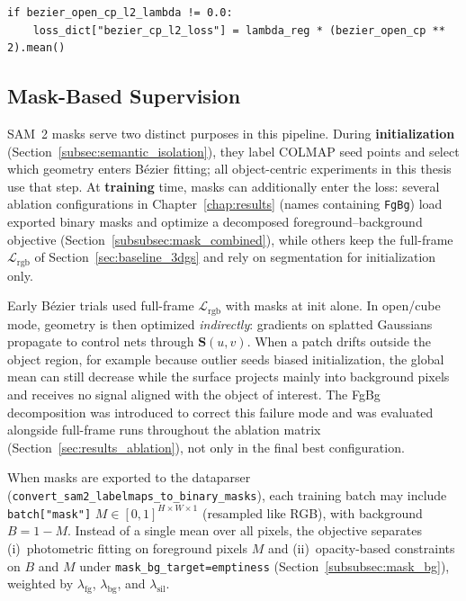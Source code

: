 \documentclass{report}
\newcommand{\filepath}[1]{\nolinkurl{#1}}
\newcommand{\code}[1]{\nolinkurl{#1}}
\begin{document}
\begin{lstlisting}[caption={Optional CP $L_2$ term (\filepath{splatfacto.py}).},label={lst:cp_l2}]
if bezier_open_cp_l2_lambda != 0.0:
    loss_dict["bezier_cp_l2_loss"] = lambda_reg * (bezier_open_cp ** 2).mean()
\end{lstlisting}

\subsection{Mask-Based Supervision}
\label{subsec:mask_losses}

SAM~2 masks serve two distinct purposes in this pipeline. During \textbf{initialization} (Section~\ref{subsec:semantic_isolation}), they label COLMAP seed points and select which geometry enters B\'ezier fitting; all object-centric experiments in this thesis use that step. At \textbf{training} time, masks can additionally enter the loss: several ablation configurations in Chapter~\ref{chap:results} (names containing \texttt{FgBg}) load exported binary masks and optimize a decomposed foreground--background objective (Section~\ref{subsubsec:mask_combined}), while others keep the full-frame $\mathcal{L}_{\mathrm{rgb}}$ of Section~\ref{sec:baseline_3dgs} and rely on segmentation for initialization only.

Early B\'ezier trials used full-frame $\mathcal{L}_{\mathrm{rgb}}$ with masks at init alone. In open/cube mode, geometry is then optimized \emph{indirectly}: gradients on splatted Gaussians propagate to control nets through $\mathbf{S}(u,v)$. When a patch drifts outside the object region, for example because outlier seeds biased initialization, the global mean can still decrease while the surface projects mainly into background pixels and receives no signal aligned with the object of interest. The FgBg decomposition was introduced to correct this failure mode and was evaluated alongside full-frame runs throughout the ablation matrix (Section~\ref{sec:results_ablation}), not only in the final best configuration.

When masks are exported to the dataparser (\code{convert\_sam2\_labelmaps\_to\_binary\_masks}), each training batch may include \code{batch["mask"]} $M\in[0,1]^{H\times W\times 1}$ (resampled like RGB), with background $B=1-M$. Instead of a single mean over all pixels, the objective separates (i)~photometric fitting on foreground pixels $M$ and (ii)~opacity-based constraints on $B$ and $M$ under \texttt{mask\_bg\_target=emptiness} (Section~\ref{subsubsec:mask_bg}), weighted by $\lambda_{\mathrm{fg}}$, $\lambda_{\mathrm{bg}}$, and $\lambda_{\mathrm{sil}}$.
\end{document}
